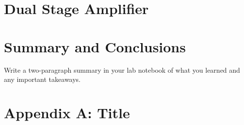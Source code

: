 \documentclass[10pt]{PhysLab1C} %
\begin{document}
\section{Dual Stage Amplifier}


\section{Summary and Conclusions}

Write a two-paragraph summary in your lab notebook of what you learned
and any important takeaways.


\section*{Appendix A: Title}


\end{document}
